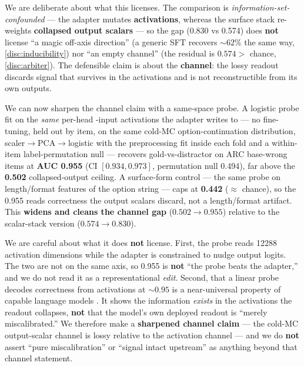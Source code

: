 We are deliberate about what this licenses. The comparison is
\emph{information-set-confounded} --- the adapter mutates \textbf{activations},
whereas the surface stack re-weights \textbf{collapsed output scalars} --- so the
gap (0.830 vs 0.574) does \textbf{not} license ``a magic off-axis direction'' (a
generic SFT recovers ${\sim}62\%$ the same way, \cref{disc:inducibility}) nor ``an
empty channel'' (the residual is $0.574 >$ chance, \cref{disc:arbiter}). The
defensible claim is about the \textbf{channel}: the lossy readout discards signal
that survives in the activations and is not reconstructible from its own outputs.

We can now sharpen the channel claim with a same-space probe. A logistic probe fit
on the \emph{same} per-head -input activations the adapter writes to
--- no fine-tuning, held out by item, on the same cold-MC option-continuation
distribution, scaler${\rightarrow}$PCA${\rightarrow}$logistic with the preprocessing
fit inside each fold and a within-item label-permutation null --- recovers
gold-vs-distractor on ARC base-wrong items at \textbf{AUC 0.955} (CI
$[0.934, 0.973]$, permutation null 0.494), far above the \textbf{0.502}
collapsed-output ceiling. A surface-form control --- the same probe on length/format
features of the option string --- caps at \textbf{0.442} (${\approx}$ chance), so
the 0.955 reads correctness the output scalars discard, not a length/format
artifact. This \textbf{widens and cleans the channel gap}
($0.502{\rightarrow}0.955$) relative to the scalar-stack version
($0.574{\rightarrow}0.830$).

We are careful about what it does \textbf{not} license. First, the probe reads
12288 activation dimensions while the adapter is constrained to nudge output logits.
The two are not on the same axis, so 0.955 is \textbf{not} ``the probe beats the
adapter,'' and we do not read it as a representational \emph{edit}. Second, that a
linear probe decodes correctness from activations at ${\sim}0.95$ is a
near-universal property of capable language models
\citep{AzariaMitchell,MarksTegmark}. It shows the information \emph{exists} in the
activations the readout collapses, \textbf{not} that the model's own deployed
readout is ``merely miscalibrated.'' We therefore make a \textbf{sharpened channel
claim} --- the cold-MC output-scalar channel is lossy relative to the activation
channel --- and we do \textbf{not} assert ``pure miscalibration'' or ``signal intact
upstream'' as anything beyond that channel statement.

